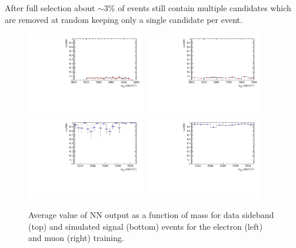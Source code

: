 After full selection about $\sim 3\%$ of events still contain multiple candidates
which are removed at random keeping only a single candidate per event.
%
\begin{figure}[h!]
\centering
\includegraphics[width=0.46\textwidth]{RKst/figs/Training/EE_wNB_vs_MPV_bkg.pdf}
\includegraphics[width=0.46\textwidth]{RKst/figs/Training/MM_wNB_vs_MPV_bkg.pdf}
\includegraphics[width=0.46\textwidth]{RKst/figs/Training/EE_wNB_vs_MPV_sgn.pdf}
\includegraphics[width=0.46\textwidth]{RKst/figs/Training/MM_wNB_vs_MPV_sgn.pdf}
\caption{Average value of NN output as a function of \Bz mass for data
sideband (top) and simulated signal (bottom) events for the electron (left) and muon (right) training.}
\label{fig:RKst_NNprofiles}
\end{figure}
